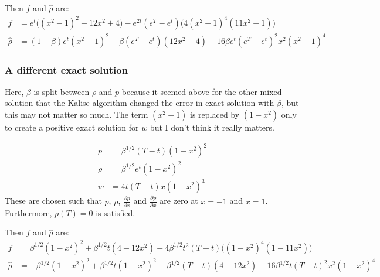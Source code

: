 \documentclass[11pt, a4paper]{article}
\theoremstyle{definition}
\begin{document}
Then $f$ and $\hat \rho$ are:
\begin{align*}
f &= e^t\bigg((x^2 - 1)^2 - 12x^2 +4 \bigg) - e^{2t} (e^T - e^t)\bigg(4(x^2 - 1)^4 (11x^2 -1)\bigg)\\
\hat \rho &= (1 - \beta)e^t(x^2-1)^2 + \beta(e^T - e^t)(12x^2 -4) - 16 \beta e^t(e^T - e^t)^2 x^2 (x^2 - 1)^4
\end{align*}

\subsubsection*{A different exact solution}
Here, $\beta$ is split between $\rho$ and $p$ because it seemed above for the other mixed solution that the Kalise algorithm changed the error in exact solution with $\beta$, but this may not matter so much. The term $(x^2-1)$ is replaced by $(1-x^2)$ only to create a positive exact solution for $w$ but I don't think it really matters.

\begin{align*}
p &= \beta^{1/2}(T-t)(1 - x^2 )^2\\
\rho &= \beta^{1/2}e^t(1-x^2)^2\\
w &= 4t(T-t)x(1-x^2)^3
\end{align*}
These are chosen such that $p$, $\rho$, $\frac{\partial p}{\partial x}$ and $\frac{\partial \rho}{\partial x}$ are zero at $x=-1$ and $x=1$. Furthermore, $p(T) = 0$ is satisfied.

Then $f$ and $\hat \rho$ are:
\begin{align*}
f &= \beta^{1/2}(1 - x^2 )^2  + \beta^{1/2} t (4- 12x^2) + 4\beta^{1/2} t^2(T-t)\bigg((1 - x^2 )^4 (1- 11x^2)\bigg)\\
\hat \rho &=-\beta^{1/2}(1-x^2)^2 +\beta^{1/2}t(1-x^2)^2 -\beta^{1/2}(T-t)(4 - 12x^2) - 16 \beta^{1/2} t(T-t)^2 x^2 (1-x^2)^4
\end{align*}
\end{document}
